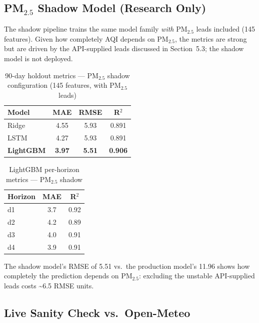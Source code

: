 \documentclass[11pt,a4paper]{article}
\begin{document}
\subsection{PM$_{2.5}$ Shadow Model (Research Only)}

The shadow pipeline trains the same model family \emph{with} PM$_{2.5}$ leads
included (145 features).  Given how completely AQI depends on PM$_{2.5}$, the
metrics are strong but are driven by the API-supplied leads discussed in
Section~5.3; the shadow model is not deployed.

\begin{table}[H]
\centering
\caption{90-day holdout metrics — PM$_{2.5}$ shadow configuration (145 features, with PM$_{2.5}$ leads)}
\begin{tabular}{lccc}
\toprule
\textbf{Model} & \textbf{MAE} & \textbf{RMSE} & \textbf{R$^2$} \\
\midrule
Ridge             & 4.55 & 5.93 & 0.891 \\
LSTM              & 4.27 & 5.93 & 0.891 \\
\textbf{LightGBM} & \textbf{3.97} & \textbf{5.51} & \textbf{0.906} \\
\bottomrule
\end{tabular}
\end{table}

\begin{table}[H]
\centering
\caption{LightGBM per-horizon metrics — PM$_{2.5}$ shadow}
\begin{tabular}{lcc}
\toprule
\textbf{Horizon} & \textbf{MAE} & \textbf{R$^2$} \\
\midrule
d1 & 3.7 & 0.92 \\
d2 & 4.2 & 0.89 \\
d3 & 4.0 & 0.91 \\
d4 & 3.9 & 0.91 \\
\bottomrule
\end{tabular}
\end{table}

\noindent The shadow model's RMSE of 5.51 vs.\ the production model's 11.96
shows how completely the prediction depends on PM$_{2.5}$: excluding the
unstable API-supplied leads costs \textasciitilde6.5 RMSE units.

\subsection{Live Sanity Check vs.\ Open-Meteo}
\end{document}

